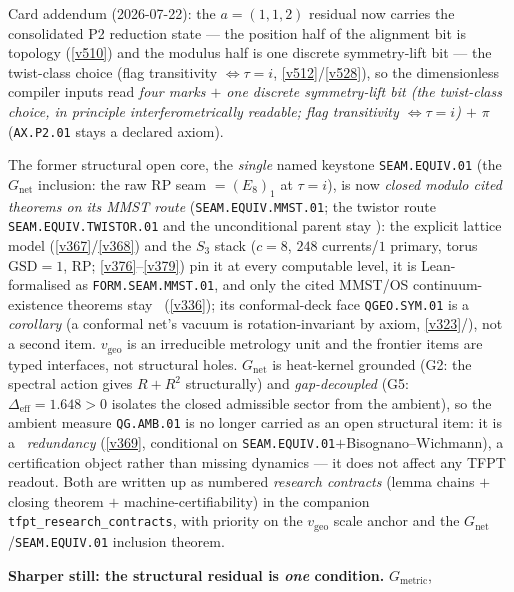 \documentclass[11pt,a4paper]{article}
\begin{document}
\markerkey
\noindent Card addendum (2026-07-22): the $a=(1,1,2)$ residual now carries the consolidated P2
reduction state --- the position half of the alignment bit is topology (\vref{v510}) and the modulus
half is one discrete symmetry-lift bit --- the twist-class choice (flag transitivity
$\iff\tau=i$, \vref{v512}/\vref{v528}), so the
dimensionless compiler inputs read \emph{four marks $+$ one discrete symmetry-lift bit (the
twist-class choice, in principle interferometrically readable; flag
transitivity $\iff\tau=i$) $+$ $\pi$}
(\texttt{AX.P2.01} stays a declared axiom).
\par\smallskip
\noindent The former structural open core, the \emph{single} named keystone \texttt{SEAM.EQUIV.01} (the
$G_{\mathrm{net}}$ inclusion: the raw RP seam $=(E_8)_1$ at $\tau{=}i$), is now \emph{closed modulo cited theorems
on its MMST route} (\texttt{SEAM.EQUIV.MMST.01}; the twistor route \texttt{SEAM.EQUIV.TWISTOR.01} and the
unconditional parent stay \mO):
the explicit lattice model (\vref{v367}/\vref{v368}) and the $S_3$ stack ($c{=}8$, $248$ currents/$1$ primary, torus
$\mathrm{GSD}{=}1$, RP; \vref{v376}--\vref{v379}) pin it at every computable level, it is Lean-formalised as
\texttt{FORM.SEAM.MMST.01}, and only the cited MMST/OS continuum-existence theorems stay \mO\ (\vref{v336}); its
conformal-deck face \texttt{QGEO.SYM.01} is a \emph{corollary} (a conformal net's vacuum is rotation-invariant by axiom,
\vref{v323}/), not a second item. $v_{\mathrm{geo}}$ is an irreducible metrology
unit and the frontier items are typed interfaces, not structural holes. $G_{\mathrm{net}}$ is heat-kernel
grounded (G2: the spectral action gives $R+R^2$ structurally) and \emph{gap-decoupled} (G5:
$\Delta_{\mathrm{eff}}{=}1.648{>}0$ isolates the closed admissible sector from the ambient), so the
ambient measure \texttt{QG.AMB.01} is no longer carried as an open structural item: it is a \mC\ \emph{redundancy}
(\vref{v369}, conditional on \texttt{SEAM.EQUIV.01}${+}$Bisognano--Wichmann), a certification object rather than
missing dynamics --- it does not affect any TFPT readout. Both are written up
as numbered \emph{research contracts} (lemma chains $+$ closing theorem $+$ machine-certifiability) in the
companion \texttt{tfpt\_research\_contracts}, with priority on the $v_{\mathrm{geo}}$ scale anchor and the
$G_{\mathrm{net}}$/\texttt{SEAM.EQUIV.01} inclusion theorem.
\par\smallskip\noindent\textbf{Sharper still: the structural residual is \emph{one} condition.} $G_{\mathrm{metric}}$,
\end{document}
